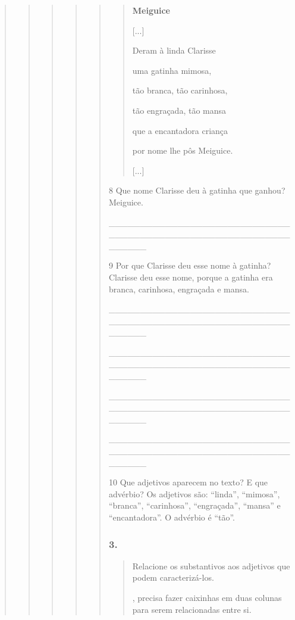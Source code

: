 \begin{quote}
\begin{quote}
\begin{quote}
\begin{quote}
\begin{quote}
\begin{quote}
\textbf{Meiguice}

{[}...{]}

Deram à linda Clarisse

uma gatinha mimosa,

tão branca, tão carinhosa,

tão engraçada, tão mansa

que a encantadora criança

por nome lhe pôs Meiguice.

{[}...{]}

\end{quote}

\num{8} Que nome Clarisse deu à gatinha que ganhou? Meiguice.

\_\_\_\_\_\_\_\_\_\_\_\_\_\_\_\_\_\_\_\_\_\_\_\_\_\_\_\_\_\_\_\_\_\_\_\_\_\_\_\_\_\_\_\_\_\_\_\_\_\_\_\_\_\_\_\_\_\_\_\_\_\_\_\_

\num{9} Por que Clarisse deu esse nome à gatinha? Clarisse deu esse nome, porque a gatinha era
branca, carinhosa, engraçada e mansa.

\_\_\_\_\_\_\_\_\_\_\_\_\_\_\_\_\_\_\_\_\_\_\_\_\_\_\_\_\_\_\_\_\_\_\_\_\_\_\_\_\_\_\_\_\_\_\_\_\_\_\_\_\_\_\_\_\_\_\_\_\_\_\_\_

\_\_\_\_\_\_\_\_\_\_\_\_\_\_\_\_\_\_\_\_\_\_\_\_\_\_\_\_\_\_\_\_\_\_\_\_\_\_\_\_\_\_\_\_\_\_\_\_\_\_\_\_\_\_\_\_\_\_\_\_\_\_\_\_

\_\_\_\_\_\_\_\_\_\_\_\_\_\_\_\_\_\_\_\_\_\_\_\_\_\_\_\_\_\_\_\_\_\_\_\_\_\_\_\_\_\_\_\_\_\_\_\_\_\_\_\_\_\_\_\_\_\_\_\_\_\_\_\_

\_\_\_\_\_\_\_\_\_\_\_\_\_\_\_\_\_\_\_\_\_\_\_\_\_\_\_\_\_\_\_\_\_\_\_\_\_\_\_\_\_\_\_\_\_\_\_\_\_\_\_\_\_\_\_\_\_\_\_\_\_\_\_\_

\num{10} Que adjetivos aparecem no texto? E que advérbio?
Os adjetivos são: ``linda'', ``mimosa'', ``branca'', ``carinhosa'', ``engraçada'', ``mansa'' e ``encantadora''. O advérbio é ``tão''.

\subsubsection{3. }\label{section-59}

\begin{quote}
Relacione os substantivos aos adjetivos que podem caracterizá-los.

\Paulo, precisa fazer caixinhas em duas colunas para serem relacionadas entre si.


\end{quote}
\end{quote}
\end{quote}
\end{quote}
\end{quote}
\end{quote}
